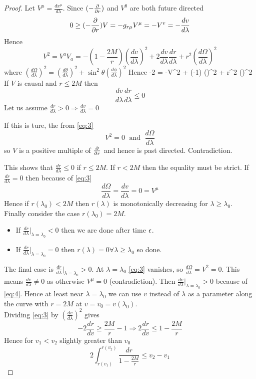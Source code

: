 \documentclass{article}
\begin{document}
\begin{proof}
Let $V^\mu = \frac{dx^\mu}{d\lambda}$. Since $(-\frac{\partial}{\partial r})$ and $V^0$ are both future directed 
\[
0 \geq (-\frac{\partial}{\partial r}) V = -g_{r\mu}V^\mu = -V^v = -\frac{dv}{d\lambda}
\]
\be \label{eq:4}
\Rightarrow {} 
\ee
Hence 
\[
V^2 = V^a V_a = -(1-\frac{2M}{r}) (\frac{dv}{d\lambda})^2 + 2 \frac{dv}{d\lambda} \frac{dr}{d\lambda} + r^2 (\frac{d\Omega}{d\lambda})^2
\]
where $ (\frac{d\Omega}{d\lambda})^2 = (\frac{d\theta}{d\lambda})^2 + \sin^2 \theta (\frac{d\phi}{d\lambda})^2$
Hence 
\be \label{eq:3}
-2  = -V^2 + (-1) ()^2 + r^2 ()^2
\ee
If $V$ is causal and $r\leq 2M$ then 
\[
\frac{dv}{d\lambda} \frac{dr}{d\lambda} \leq 0 
\]
Let us assume $\frac{dr}{d\lambda} > 0 \Rightarrow \frac{dv}{d\lambda} = 0$

If this is ture, the from \ref{eq:3} 
\[
V^2 = 0 \; \text{ and } \; \frac{d\Omega}{d\lambda}
\]
so $V$ is a positive multiple of $\frac{\partial}{\partial r}$ and hence is past directed. Contradiction. 

This shows that $\frac{dr}{d\lambda} \leq 0 $ if $r\leq 2M$. If $r< 2M$ then the equality must be strict. If $\frac{dr}{d\lambda}=0$ then because of \ref{eq:3} 
\[
\frac{d\Omega}{d\lambda} = \frac{dv}{d\lambda}=0 = V^\mu
\]
Hence if $r(\lambda_0)<2M$ then $r(\lambda)$ is monotonically decreasing for $\lambda \geq \lambda_0$. \\
Finally consider the case $r(\lambda_0)=2M$. 
\begin{itemize}
    \item If $\frac{dr}{d\lambda}\rvert_{\lambda=\lambda_0} <0$ then we are done after time $\epsilon$. 
    \item If $\frac{dr}{d\lambda}\rvert_{\lambda=\lambda_0} =0$ then $r(\lambda)=0 \forall \lambda \geq \lambda_0$ so done. 
\end{itemize}
The final case is $\frac{dr}{d\lambda}\rvert_{\lambda=\lambda_0}>0$. At $\lambda=\lambda_0$ \ref{eq:3} vanishes, so $\frac{d\Omega}{d\lambda}=V^2=0$. This means $\frac{dv}{d\lambda} \neq 0 $ as otherwise $V^\mu=0$ (contradiction). Then $\frac{dv}{d\lambda}\rvert_{\lambda=\lambda_0} >0$ because of \ref{eq:4}. Hence at least near $\lambda = \lambda_0$ we can use $v$ instead of $\lambda$ as a parameter along the curve with $r=2M$ at $v=v_0=v(\lambda_0)$. \\
Dividing \ref{eq:3} by $(\frac{dv}{d\lambda})^2$ gives 
\[
-2\frac{dr}{dv} \geq \frac{2M}{r}-1 \Rightarrow 2\frac{dr}{dv} \leq 1-\frac{2M}{r}
\]
Hence for $v_1< v_2$ slightly greater than $v_0$ 
\[
2 \int_{r(v_1)}^{r(v_2)} \frac{dr}{1-\frac{2M}{r}} \leq v_2 - v_1
\]
\end{proof}
\end{document}
